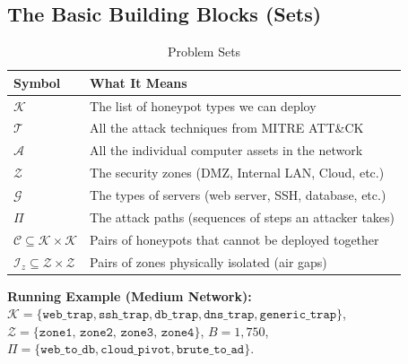 \documentclass[journal]{IEEEtran}
\newcommand{\calK}{\mathcal{K}}
\newcommand{\calT}{\mathcal{T}}
\newcommand{\calA}{\mathcal{A}}
\newcommand{\calZ}{\mathcal{Z}}
\newcommand{\calG}{\mathcal{G}}
\newcommand{\calC}{\mathcal{C}}
\newcommand{\calPi}{\mathcal{\Pi}}
\begin{document}
\subsection{The Basic Building Blocks (Sets)}

\begin{table}[htbp]
\caption{Problem Sets}
\label{tab:sets}
\centering
\renewcommand{\arraystretch}{1.2}
\begin{tabular}{@{}ll@{}}
\toprule
\textbf{Symbol} & \textbf{What It Means} \\
\midrule
$\calK$ & The list of honeypot types we can deploy \\
$\calT$ & All the attack techniques from MITRE ATT\&CK \\
$\calA$ & All the individual computer assets in the network \\
$\calZ$ & The security zones (DMZ, Internal LAN, Cloud, etc.) \\
$\calG$ & The types of servers (web server, SSH, database, etc.) \\
$\calPi$ & The attack paths (sequences of steps an attacker takes) \\
$\calC \subseteq \calK \times \calK$ &
  Pairs of honeypots that cannot be deployed together \\
$\mathcal{I}_z \subseteq \calZ \times \calZ$ &
  Pairs of zones physically isolated (air gaps) \\
\bottomrule
\end{tabular}
\end{table}

\begin{examplebox}
\textbf{Running Example (Medium Network):}
$\calK = \{\texttt{web\_trap}, \texttt{ssh\_trap},
\texttt{db\_trap}, \texttt{dns\_trap},
\texttt{generic\_trap}\}$,
$\calZ = \{\texttt{zone1, zone2, zone3, zone4}\}$,
$B = 1{,}750$,
$\calPi = \{\texttt{web\_to\_db}, \texttt{cloud\_pivot},
\texttt{brute\_to\_ad}\}$.
\end{examplebox}
\end{document}
